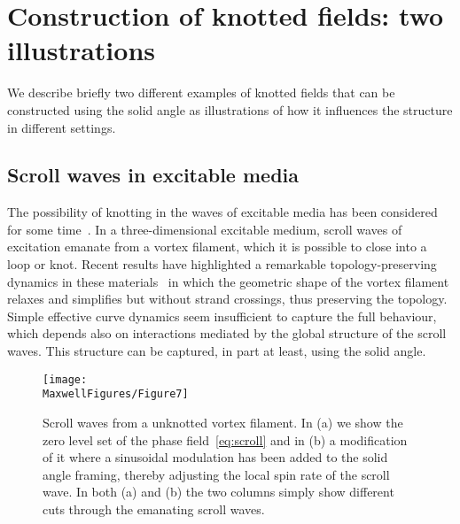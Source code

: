     \section{Construction of knotted fields: two illustrations}

    We describe briefly two different examples of knotted fields that can be constructed using the solid angle as illustrations of how it influences the structure in different settings. 

    \subsection{Scroll waves in excitable media}
    \label{subsec:scroll}

    The possibility of knotting in the waves of excitable media has been considered for some time~\citep{Winfree1983,Winfree1984}. In a three-dimensional excitable medium, scroll waves of excitation emanate from a vortex filament, which it is possible to close into a loop or knot. Recent results have highlighted a remarkable topology-preserving dynamics in these materials~\citep{Maucher2016,Maucher2017,Maucher2018} in which the geometric shape of the vortex filament relaxes and simplifies but without strand crossings, thus preserving the topology. Simple effective curve dynamics seem insufficient to capture the full behaviour, which depends also on interactions mediated by the global structure of the scroll waves. This structure can be captured, in part at least, using the solid angle. 

    \begin{figure}[htbp]
        \centering
        \texttt{[image: \\MaxwellFigures/Figure7]}
        \caption[Constructing scroll waves from solid angle.]{Scroll waves from a unknotted vortex filament. In (a) we show the zero level set of the phase field~\eqref{eq:scroll} and in (b) a modification of it where a sinusoidal modulation has been added to the solid angle framing, thereby adjusting the local spin rate of the scroll wave. In both (a) and (b) the two columns simply show different cuts through the emanating scroll waves.}
        \label{fig:scroll}
    \end{figure}

